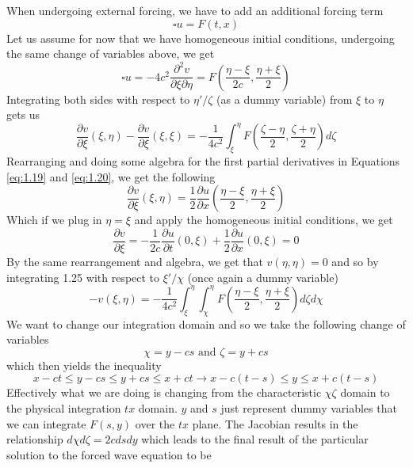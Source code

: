 \documentclass{article}
\newcommand{\pd}[2]{\frac{\partial #1}{\partial #2}}
\numberwithin{equation}{section}
\begin{document}
When undergoing external forcing, we have to add an additional forcing term 
\begin{equation*}
    \square u=F(t,x)
\end{equation*}
Let us assume for now that we have homogeneous initial conditions, undergoing the same change of variables above, we get 
\begin{equation*}
    \square u=-4c^2\frac{\partial^2v}{\partial\xi\partial\eta}=F\left(\frac{\eta-\xi}{2c},\frac{\eta+\xi}{2}\right)
\end{equation*}
Integrating both sides with respect to $\eta' /\zeta$ (as a dummy variable) from $\xi$ to $\eta$ gets us
\begin{equation*}
    \pd{v}{\xi}(\xi,\eta)-\pd{v}{\xi}(\xi,\xi) = -\frac{1}{4c^2}\int^\eta_\xi F\left(\frac{\zeta-\eta}{2},\frac{\zeta+\eta}{2}\right)d\zeta
\end{equation*}
Rearranging and doing some algebra for the first partial derivatives in Equations \eqref{eq:1.19} and \eqref{eq:1.20}, we get the following
\begin{equation}
    \pd{v}{\xi}(\xi,\eta)=\frac{1}{2}\pd{u}{x}\left(\frac{\eta-\xi}{2},\frac{\eta+\xi}{2}\right)\label{eq:1.25}
\end{equation}
Which if we plug in $\eta=\xi$ and apply the homogeneous initial conditions, we get 
\begin{equation*}
    \pd{v}{\xi}=-\frac{1}{2c}\pd{u}{t}(0,\xi) + \frac{1}{2}\pd{u}{x}(0,\xi) = 0
\end{equation*}
By the same rearrangement and algebra, we get that $v(\eta,\eta)=0$ and so by integrating 1.25 with respect to $\xi'/\chi$ (once again a dummy variable)
\begin{equation}
    -v(\xi,\eta)=-\frac{1}{4c^2}\int^\eta_\xi\int^\eta_\chi F\left(\frac{\eta-\xi}{2},\frac{\eta+\xi}{2}\right)d\zeta d\chi
\end{equation}
We want to change our integration domain and so we take the following change of variables
\begin{equation*}
    \chi=y-cs \text{ and } \zeta=y+cs
\end{equation*}
which then yields the inequality
\begin{equation*}
    x-ct \leq y-cs \leq y+cs \leq x+ct \rightarrow x-c(t-s)\leq y \leq x+c(t-s)    
\end{equation*}
Effectively what we are doing is changing from the characteristic $\chi\zeta$ domain to the physical integration $tx$ domain. $y$ and $s$ just represent dummy variables that we can integrate $F(s,y)$ over the $tx$ plane. The Jacobian results in the relationship $d\chi d\zeta = 2c dsdy$ which leads to the final result of the particular solution to the forced wave equation to be 
\end{document}
